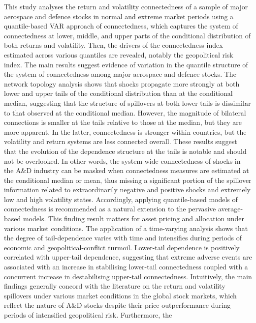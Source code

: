 \documentclass[
  letterpaper,
  DIV=11,
  numbers=noendperiod]{scrartcl}
\begin{document}
This study analyses the return and volatility connectedness of a sample
of major aerospace and defence stocks in normal and extreme market
periods using a quantile-based VAR approach of connectedness, which
captures the system of connectedness at lower, middle, and upper parts
of the conditional distribution of both returns and volatility. Then,
the drivers of the connectedness index estimated across various
quantiles are revealed, notably the geopolitical risk index. The main
results suggest evidence of variation in the quantile structure of the
system of connectedness among major aerospace and defence stocks. The
network topology analysis shows that shocks propagate more strongly at
both lower and upper tails of the conditional distribution than at the
conditional median, suggesting that the structure of spillovers at both
lower tails is dissimilar to that observed at the conditional median.
However, the magnitude of bilateral connections is smaller at the tails
relative to those at the median, but they are more apparent. In the
latter, connectedness is stronger within countries, but the volatility
and return systems are less connected overall. These results suggest
that the evolution of the dependence structure at the tails is notable
and should not be overlooked. In other words, the system-wide
connectedness of shocks in the A\&D industry can be masked when
connectedness measures are estimated at the conditional median or mean,
thus missing a significant portion of the spillover information related
to extraordinarily negative and positive shocks and extremely low and
high volatility states. Accordingly, applying quantile-based models of
connectedness is recommended as a natural extension to the pervasive
average-based models. This finding result matters for asset pricing and
allocation under various market conditions. The application of a
time-varying analysis shows that the degree of tail-dependence varies
with time and intensifies during periods of economic and
geopolitical-conflict turmoil. Lower-tail dependence is positively
correlated with upper-tail dependence, suggesting that extreme adverse
events are associated with an increase in stabilising lower-tail
connectedness coupled with a concurrent increase in destabilising
upper-tail connectedness. Intuitively, the main findings generally
concord with the literature on the return and volatility spillovers
under various market conditions in the global stock markets, which
reflect the nature of A\&D stocks despite their price outperformance
during periods of intensified geopolitical risk. Furthermore, the
\end{document}
